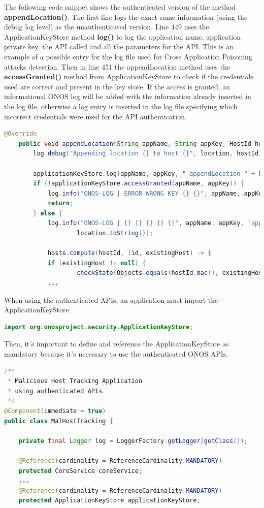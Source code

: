 The following code snippet shows the authenticated version of the method \textbf{appendLocation()}. The first line logs the exact same information (using the debug log level) as the unauthenticated version. Line 449 uses the ApplicationKeyStore method \textbf{log()} to log the application name, application private key, the API called and all the parameters for the API. This is an example of a possible entry for the log file used for Cross Application Poisoning attacks detection. Then in line 451 the appendLocation method uses the \textbf{accessGranted()} method from ApplicationKeyStore to check if the credentials used are correct and present in the key store. If the access is granted, an informational ONOS log will be added with the information already inserted in the log file, otherwise a log entry is inserted in the log file specifying which incorrect credentials were used for the API authentication.
\begin{lstlisting}[language=java,firstnumber=445]
    @Override
    public void appendLocation(String appName, String appKey, HostId hostId, HostLocation location) {
        log.debug("Appending location {} to host {}", location, hostId);

        applicationKeyStore.log(appName, appKey, " appendLocation " + hostId.toString() + " " + location.toString());
        if (!applicationKeyStore.accessGranted(appName, appKey)) {
            log.info("ONOS-LOG | ERROR WRONG KEY {} {}", appName, appKey);
            return;
        } else {
            log.info("ONOS-LOG | {} {} {} {} {}", appName, appKey, "appendLocation", hostId.toString(),
                    location.toString());

            hosts.compute(hostId, (id, existingHost) -> {
            if (existingHost != null) {
                    checkState(Objects.equals(hostId.mac(), existingHost.mac()), "Existing and new MAC addresses differ.");
            ...
\end{lstlisting}

When using the authenticated APIs, an application must import the ApplicationKeyStore.
\begin{lstlisting}[language=java,firstnumber=45]
import org.onosproject.security.ApplicationKeyStore;
\end{lstlisting}

Then, it's important to define and  reference the ApplicationKeyStore as mandatory because it's necessary to use the authenticated ONOS APIs.
\begin{lstlisting}[language=java,firstnumber=47]
/**
 * Malicious Host Tracking Application
 * using authenticated APIs.
 */
@Component(immediate = true)
public class MalHostTracking {

    private final Logger log = LoggerFactory.getLogger(getClass());

    @Reference(cardinality = ReferenceCardinality.MANDATORY)
    protected CoreService coreService;
    ...
    @Reference(cardinality = ReferenceCardinality.MANDATORY)
    protected ApplicationKeyStore applicationKeyStore;
\end{lstlisting}

